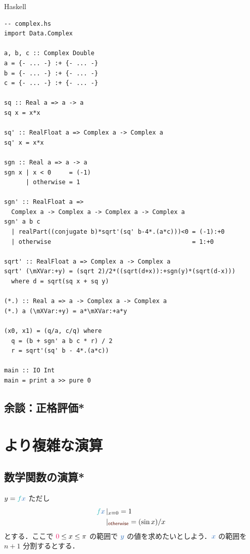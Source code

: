 \documentclass[a5paper,twoside,fleqn,draft]{jsbook}
\def\constantColor{WildStrawberry}
\def\keywordColor{Sepia}
\def\varColor{NavyBlue}
\def\funcColor{BlueGreen}
\newcommand{\programminglanguage}[1]{\textsf{#1}}
\newcommand{\haskell}{\programminglanguage{Haskell}}
\newenvironment{haskellcode}{\begin{itembox}[r]{\haskell}}{\end{itembox}}
\newcommand{\mKeyword}[1]{\textcolor{\keywordColor}{\mathsf{#1}}}
\newcommand{\mOtherwiseKeyword}{\mKeyword{otherwise}}
\DeclareMathOperator{\mOtherwise}{\mOtherwiseKeyword}
\newcommand{\mConstant}[1]{\textcolor{\constantColor}{#1}}
\newcommand{\mZeroNumber}{{\mConstant{0}}}
\newcommand{\mVar}[1]{\textcolor{\varColor}{#1}}
\newcommand{\mXVar}{\mVar{x}}
\newcommand{\mYVar}{\mVar{y}}
\newcommand{\mFunc}[1]{\textcolor{\funcColor}{#1}}
\newcommand{\mFFunc}{{\mFunc{f}}}
\newcommand{\mGuard}[1]{\mathop{\mid_{#1}}}
\begin{document}
\begin{haskellcode}
\begin{verbatim}
-- complex.hs
import Data.Complex

a, b, c :: Complex Double
a = {- ... -} :+ {- ... -}
b = {- ... -} :+ {- ... -}
c = {- ... -} :+ {- ... -}

sq :: Real a => a -> a
sq x = x*x

sq' :: RealFloat a => Complex a -> Complex a
sq' x = x*x

sgn :: Real a => a -> a
sgn x | x < 0     = (-1)
      | otherwise = 1

sgn' :: RealFloat a =>
  Complex a -> Complex a -> Complex a -> Complex a
sgn' a b c
  | realPart((conjugate b)*sqrt'(sq' b-4*.(a*c)))<0 = (-1):+0
  | otherwise                                       = 1:+0

sqrt' :: RealFloat a => Complex a -> Complex a
sqrt' (\mXVar:+y) = (sqrt 2)/2*((sqrt(d+x)):+sgn(y)*(sqrt(d-x)))
  where d = sqrt(sq x + sq y)

(*.) :: Real a => a -> Complex a -> Complex a
(*.) a (\mXVar:+y) = a*\mXVar:+a*y

(x0, x1) = (q/a, c/q) where
  q = (b + sgn' a b c * r) / 2
  r = sqrt'(sq' b - 4*.(a*c))

main :: IO Int
main = print a >> pure 0
\end{verbatim}
\end{haskellcode}

\section{余談：正格評価*}



\chapter{より複雑な演算}
\label{ch:more-arithmetic}

\section{数学関数の演算*}

$y=\mFFunc\mXVar$ ただし
\begin{equation}
\begin{aligned}
\mFFunc\mXVar&\mGuard{x\equiv0}=1\\
&\mGuard{\mOtherwise}=(\sin x)/x
\end{aligned}
\end{equation}
とする．ここで $\mZeroNumber\le x\le\pi$ の範囲で $\mYVar$ の値を求めたいとしよう．$\mXVar$
の範囲を $n+1$ 分割するとする．
\end{document}
